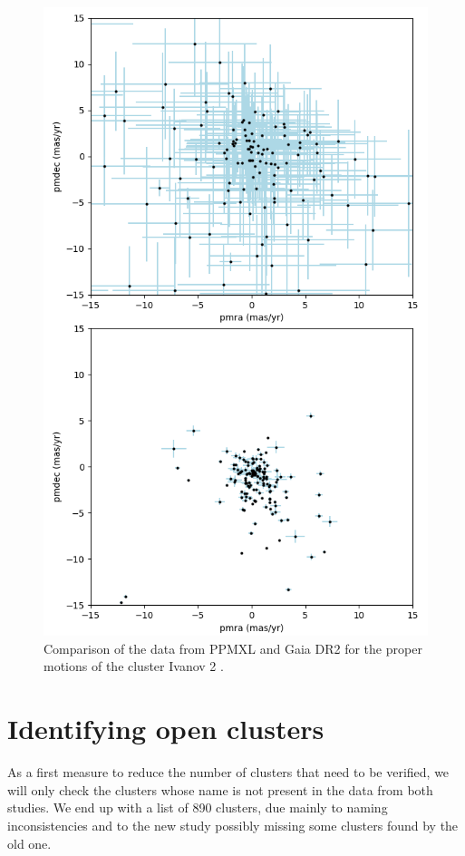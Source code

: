 \documentclass[twocolumn]{revtex4}
\begin{document}
\begin{figure}[h!]
\centering
\includegraphics[scale=0.45]{ppmxl_vs_gaia_motions}
\caption{Comparison of the data from PPMXL and Gaia DR2 for the proper motions of the cluster Ivanov 2 \cite{ivanov}.} %
\label{ppmxl_vs_gaiadr2}
\end{figure}

\section{Identifying open clusters}
As a first measure to reduce the number of clusters that need to be verified, we will only check the clusters whose name is not present in the data from both studies. We end up with a list of 890 clusters, due mainly to naming inconsistencies and to the new study possibly missing some clusters found by the old one.
\end{document}
